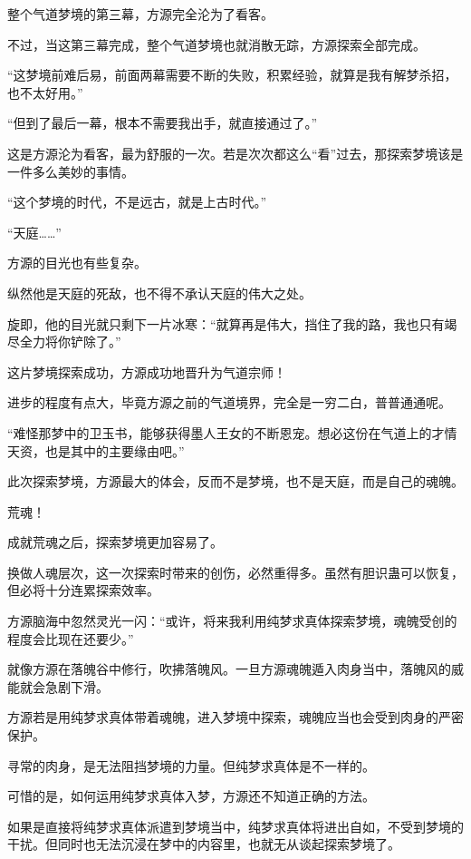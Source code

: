 
\begin{this_body}

整个气道梦境的第三幕，方源完全沦为了看客。

不过，当这第三幕完成，整个气道梦境也就消散无踪，方源探索全部完成。

“这梦境前难后易，前面两幕需要不断的失败，积累经验，就算是我有解梦杀招，也不太好用。”

“但到了最后一幕，根本不需要我出手，就直接通过了。”

这是方源沦为看客，最为舒服的一次。若是次次都这么“看”过去，那探索梦境该是一件多么美妙的事情。

“这个梦境的时代，不是远古，就是上古时代。”

“天庭……”

方源的目光也有些复杂。

纵然他是天庭的死敌，也不得不承认天庭的伟大之处。

旋即，他的目光就只剩下一片冰寒：“就算再是伟大，挡住了我的路，我也只有竭尽全力将你铲除了。”

这片梦境探索成功，方源成功地晋升为气道宗师！

进步的程度有点大，毕竟方源之前的气道境界，完全是一穷二白，普普通通呢。

“难怪那梦中的卫玉书，能够获得墨人王女的不断恩宠。想必这份在气道上的才情天资，也是其中的主要缘由吧。”

此次探索梦境，方源最大的体会，反而不是梦境，也不是天庭，而是自己的魂魄。

荒魂！

成就荒魂之后，探索梦境更加容易了。

换做人魂层次，这一次探索时带来的创伤，必然重得多。虽然有胆识蛊可以恢复，但必将十分连累探索效率。

方源脑海中忽然灵光一闪：“或许，将来我利用纯梦求真体探索梦境，魂魄受创的程度会比现在还要少。”

就像方源在落魄谷中修行，吹拂落魄风。一旦方源魂魄遁入肉身当中，落魄风的威能就会急剧下滑。

方源若是用纯梦求真体带着魂魄，进入梦境中探索，魂魄应当也会受到肉身的严密保护。

寻常的肉身，是无法阻挡梦境的力量。但纯梦求真体是不一样的。

可惜的是，如何运用纯梦求真体入梦，方源还不知道正确的方法。

如果是直接将纯梦求真体派遣到梦境当中，纯梦求真体将进出自如，不受到梦境的干扰。但同时也无法沉浸在梦中的内容里，也就无从谈起探索梦境了。


\end{this_body}
